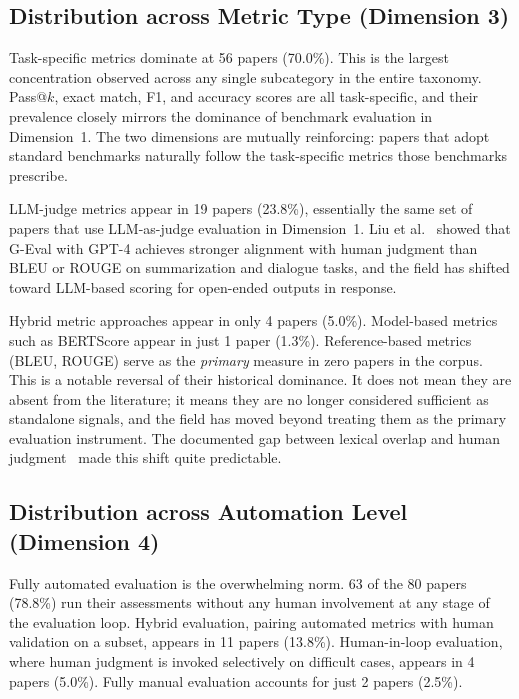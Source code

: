 \documentclass[journal]{IEEEtran}
\begin{document}
\subsection{Distribution across Metric Type (Dimension 3)}

Task-specific metrics dominate at 56 papers (70.0\%). This is the
largest concentration observed across any single subcategory in the
entire taxonomy. Pass@$k$, exact match, F1, and accuracy scores are all
task-specific, and their prevalence closely mirrors the dominance of
benchmark evaluation in Dimension~1. The two dimensions are mutually
reinforcing: papers that adopt standard benchmarks naturally follow the
task-specific metrics those benchmarks prescribe.

LLM-judge metrics appear in 19 papers (23.8\%), essentially the same
set of papers that use LLM-as-judge evaluation in Dimension~1.
Liu et al.~\cite{liu2023geval} showed that G-Eval with GPT-4
achieves stronger alignment with human judgment than BLEU or ROUGE on
summarization and dialogue tasks, and the field has shifted toward
LLM-based scoring for open-ended outputs in response.

Hybrid metric approaches appear in only 4 papers (5.0\%). Model-based
metrics such as BERTScore appear in just 1 paper (1.3\%). Reference-based
metrics (BLEU, ROUGE) serve as the \emph{primary} measure in zero papers
in the corpus. This is a notable reversal of their historical dominance. It does
not mean they are absent from the literature; it means they are no
longer considered sufficient as standalone signals, and the field has moved beyond
treating them as the primary evaluation instrument. The documented
gap between lexical overlap and human judgment~\cite{repairing2022}
made this shift quite predictable.

\subsection{Distribution across Automation Level (Dimension 4)}

Fully automated evaluation is the overwhelming norm. 63 of the 80 papers
(78.8\%) run their assessments without any human involvement at any
stage of the evaluation loop. Hybrid evaluation, pairing automated
metrics with human validation on a subset, appears in 11 papers (13.8\%).
Human-in-loop evaluation, where human judgment is invoked selectively
on difficult cases, appears in 4 papers (5.0\%). Fully manual
evaluation accounts for just 2 papers (2.5\%).
\end{document}
